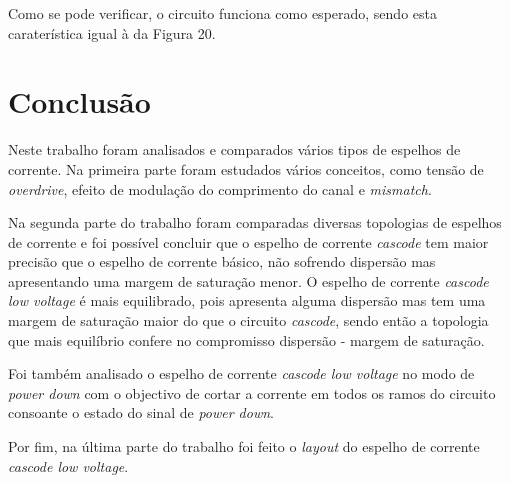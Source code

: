 \documentclass[11pt]{article}
\numberwithin{equation}{section}
\begin{document}
Como se pode verificar, o circuito funciona como esperado, sendo esta caraterística igual à da Figura 20.

\pagebreak

\section{Conclusão}

Neste trabalho foram analisados e comparados vários tipos de espelhos de corrente. Na primeira parte foram estudados vários conceitos, como tensão de \textit{overdrive}, efeito de modulação do comprimento do canal e \textit{mismatch}. 

Na segunda parte do trabalho foram comparadas diversas topologias de espelhos de corrente e foi possível concluir que o espelho de corrente \textit{cascode} tem maior precisão que o espelho de corrente básico, não sofrendo dispersão mas apresentando uma margem de saturação menor. O espelho de corrente \textit{cascode low voltage} é mais equilibrado, pois apresenta alguma dispersão mas tem uma margem de saturação maior do que o circuito \textit{cascode}, sendo então a topologia que mais equilíbrio confere no compromisso dispersão - margem de saturação.

Foi também analisado o espelho de corrente \textit{cascode low voltage} no modo de \textit{power down} com o objectivo de cortar a corrente em todos os ramos do circuito consoante o estado do sinal de \textit{power down}.

Por fim, na última parte do trabalho foi feito o \textit{layout} do espelho de corrente \textit{cascode low voltage}.
\end{document}
